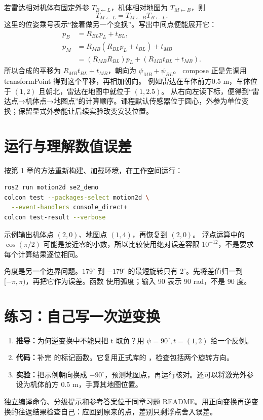 若雷达相对机体有固定外参 $T_{B\leftarrow L}$，机体相对地图为 $T_{M\leftarrow B}$，则
\begin{equation}
T_{M\leftarrow L}=T_{M\leftarrow B}T_{B\leftarrow L}.
\end{equation}
这里的位姿乘号表示“接着做另一个变换”。写出中间点便能展开它：
\begin{align}
p_B&=R_{BL}p_L+t_{BL},\\
p_M&=R_{MB}(R_{BL}p_L+t_{BL})+t_{MB}\\
   &=(R_{MB}R_{BL})p_L+(R_{MB}t_{BL}+t_{MB}).
\end{align}
所以合成的平移为 $R_{MB}t_{BL}+t_{MB}$，朝向为 $\psi_{MB}+\psi_{BL}$。
compose 正是先调用 transformPoint 得到这个平移，再相加朝向。
例如雷达在车体前方0.5 m，车体位于 $(1,2)$ 且朝北，雷达在地图中就位于 $(1,2.5)$。
从右向左读下标，便得到“雷达点→机体点→地图点”的计算顺序。课程默认传感器位于圆心，外参为单位变换；保留显式外参能让后续实验改变安装位置。

\section{运行与理解数值误差}
按第 1 章的方法重新构建、加载环境，在工作空间运行：
\begin{lstlisting}[language=bash,numbers=none]
ros2 run motion2d se2_demo
colcon test --packages-select motion2d \
  --event-handlers console_direct+
colcon test-result --verbose
\end{lstlisting}
示例输出机体点 $(2,0)$、地图点 $(1,4)$，再恢复到 $(2,0)$。
浮点运算中的 $\cos(\pi/2)$ 可能是接近零的小数，所以比较使用绝对误差容限 $10^{-12}$，不是要求每个计算结果逐位相同。

角度是另一个边界问题。$179^\circ$ 到 $-179^\circ$ 的最短旋转只有 $2^\circ$。先将差值归一到 $[-\pi,\pi)$，再把它作为误差。函数  使用弧度；输入 90 表示 90 rad，不是 90 度。

\section{练习：自己写一次逆变换}
\begin{enumerate}
\item \textbf{推导：}为何逆变换中不能只把 t 取负？用 $\psi=90^\circ,t=(1,2)$ 给一个反例。
\item \textbf{代码：}补完  的标记函数。它复用正式库的 ，检查包括两个旋转方向。
\item \textbf{实验：}把示例朝向换成 $-90^\circ$，预测地图点，再运行核对。还可以将激光外参设为机体前方 0.5 m，手算其地图位置。
\end{enumerate}
独立编译命令、分级提示和参考答案位于同章习题 README。用正向变换再逆变换的往返结果检查自己：应回到原来的点，差别只剩浮点舍入误差。

